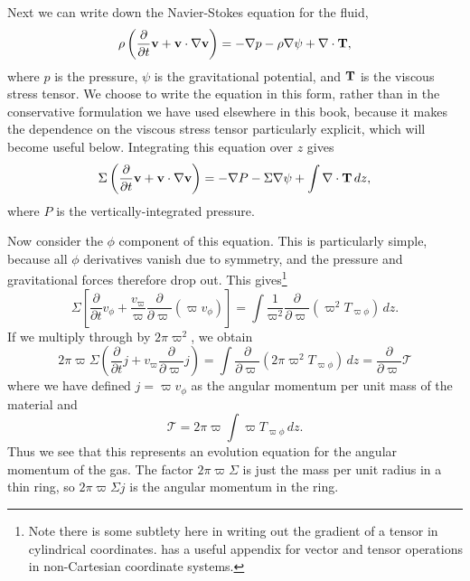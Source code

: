 Next we can write down the Navier-Stokes equation for the fluid,
\begin{equation}
\rho\left(\frac{\partial}{\partial t}\mathbf{v} + \mathbf{v}\cdot\nabla\mathbf{v}\right) = -\nabla p - \rho\nabla\psi + \nabla\cdot \mathbf{T},
\end{equation}
where $p$ is the pressure, $\psi$ is the gravitational potential, and $\mathbf{T}$ is the viscous stress tensor. We choose to write the equation in this form, rather than in the conservative formulation we have used elsewhere in this book, because it makes the dependence on the viscous stress tensor particularly explicit, which will become useful below. Integrating this equation over $z$ gives
\begin{equation}
\Sigma \left(\frac{\partial}{\partial t}\mathbf{v} + \mathbf{v}\cdot\nabla\mathbf{v}\right) = -\nabla P - \Sigma \nabla\psi + \int \nabla\cdot \mathbf{T}\,dz,
\end{equation}
where $P$ is the vertically-integrated pressure.

Now consider the $\phi$ component of this equation. This is particularly simple, because all $\phi$ derivatives vanish due to symmetry, and the pressure and gravitational forces therefore drop out. This gives\footnote{Note there is some subtlety here in writing out the gradient of a tensor in cylindrical coordinates. \citet{shu92a} has a useful appendix for vector and tensor operations in non-Cartesian coordinate systems.}
\begin{equation}
\Sigma \left[\frac{\partial}{\partial t} v_\phi + \frac{v_\varpi}{\varpi} \frac{\partial}{\partial \varpi}(\varpi v_\phi)\right] = \int \frac{1}{\varpi^2} \frac{\partial}{\partial \varpi}(\varpi^ 2 T_{\varpi\phi})\,dz.
\end{equation}
If we multiply through by $2\pi \varpi^2$, we obtain
\begin{equation}
2\pi \varpi \Sigma \left(\frac{\partial}{\partial t} j + v_\varpi \frac{\partial}{\partial \varpi}j\right) = \int \frac{\partial}{\partial \varpi}(2\pi \varpi^2 T_{\varpi\phi})\,dz = \frac{\partial}{\partial \varpi} \mathcal{T}
\end{equation}
where we have defined $j=\varpi v_\phi$ as the angular momentum per unit mass of the material and
\begin{equation}
\mathcal{T} = 2\pi \varpi \int \varpi T_{\varpi\phi}\, dz.
\end{equation}
Thus we see that this represents an evolution equation for the angular momentum of the gas. The factor $2\pi \varpi \Sigma$ is just the mass per unit radius in a thin ring, so $2\pi \varpi\Sigma j$ is the angular momentum in the ring.

